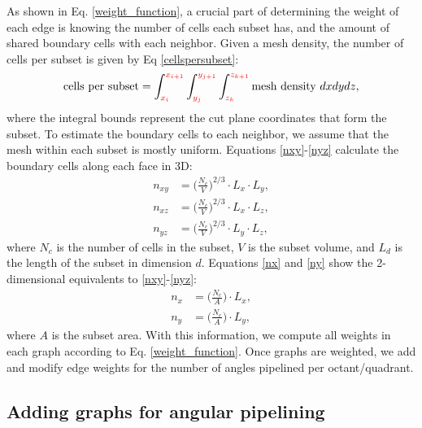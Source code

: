 As shown in Eq. \ref{weight_function}, a crucial part of determining the weight of each edge is knowing the number of cells each subset has, and the amount of shared boundary cells with each neighbor. Given a mesh density, the number of cells per subset is given by Eq \ref{cellspersubset}:
\begin{equation}
   \text{cells per subset} = \int_{\textcolor{red}{x_i}}^{\textcolor{red}{x_{i+1}}} \int_{\textcolor{red}{y_j}}^{\textcolor{red}{y_{j+1}}} \int_{\textcolor{red}{z_k}}^{\textcolor{red}{z_{k+1}}} \text{mesh density } dx dy dz,
\label{cellspersubset}
\end{equation}
where the integral bounds represent the cut plane coordinates that form the subset. To estimate the boundary cells to each neighbor, we assume that the mesh within each subset is mostly uniform. Equations \ref{nxy}-\ref{nyz} calculate the boundary cells along each face in 3D:
\begin{align}
n_{xy} &= \Big(\frac{N_c}{V}\Big)^{2/3}\cdot L_x\cdot L_y \label{nxy}, \\
n_{xz} &= \Big(\frac{N_c}{V}\Big)^{2/3}\cdot L_x\cdot L_z \label{nxz}, \\
n_{yz} &= \Big(\frac{N_c}{V}\Big)^{2/3}\cdot L_y\cdot L_z \label{nyz},
\end{align}
where $N_c$ is the number of cells in the subset, $V$ is the subset volume, and $L_d$ is the length of the subset in dimension $d$.
Equations \ref{nx} and \ref{ny} show the 2-dimensional equivalents to \ref{nxy}-\ref{nyz}:
\begin{align}
n_x &= \Big(\frac{N_c}{A}\Big)\cdot L_x, \label{nx} \\
n_y &= \Big(\frac{N_c}{A}\Big)\cdot L_y, \label{ny}
\end{align}
where $A$ is the subset area. With this information, we compute all weights in each graph according to Eq. \ref{weight_function}. Once graphs are weighted, we add and modify edge weights for the number of angles pipelined per octant/quadrant.

\subsection{Adding graphs for angular pipelining}

